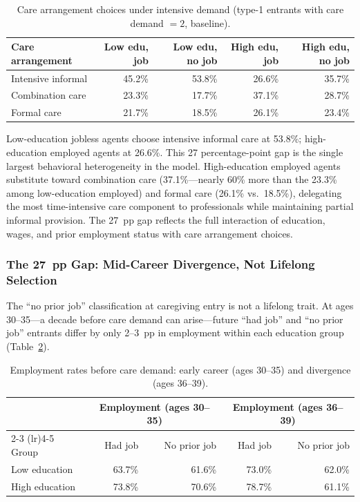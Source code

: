 \begin{table}[htbp]
  \centering
  \caption{Care arrangement choices under intensive demand (type-1 entrants with care demand $= 2$, baseline).}
  \label{tab:intensive_demand_arrangements}
  \small
  \begin{tabular}{lrrrr}
    \toprule
    Care arrangement & Low edu, job & Low edu, no job & High edu, job & High edu, no job \\
    \midrule
    Intensive informal & 45.2\% & 53.8\% & 26.6\% & 35.7\% \\
    Combination care & 23.3\% & 17.7\% & 37.1\% & 28.7\% \\
    Formal care & 21.7\% & 18.5\% & 26.1\% & 23.4\% \\
    \bottomrule
  \end{tabular}
\end{table}

Low-education jobless agents choose intensive informal care at 53.8\%; high-education employed agents at 26.6\%. This 27 percentage-point gap is the single largest behavioral heterogeneity in the model. High-education employed agents substitute toward combination care (37.1\%---nearly 60\% more than the 23.3\% among low-education employed) and formal care (26.1\% vs.\ 18.5\%), delegating the most time-intensive care component to professionals while maintaining partial informal provision. The 27~pp gap reflects the full interaction of education, wages, and prior employment status with care arrangement choices.

\subsubsection{The 27~pp Gap: Mid-Career Divergence, Not Lifelong Selection}

The ``no prior job'' classification at caregiving entry is not a lifelong trait. At ages 30--35---a decade before care demand can arise---future ``had job'' and ``no prior job'' entrants differ by only 2--3~pp in employment within each education group (Table~\ref{tab:early_employment}).

\begin{table}[htbp]
  \centering
  \caption{Employment rates before care demand: early career (ages 30--35) and divergence (ages 36--39).}
  \label{tab:early_employment}
  \small
  \begin{tabular}{lrrrr}
    \toprule
    & \multicolumn{2}{c}{Employment (ages 30--35)} & \multicolumn{2}{c}{Employment (ages 36--39)} \\
    \cmidrule(lr){2-3} \cmidrule(lr){4-5}
    Group & Had job & No prior job & Had job & No prior job \\
    \midrule
    Low education & 63.7\% & 61.6\% & 73.0\% & 62.0\% \\
    High education & 73.8\% & 70.6\% & 78.7\% & 61.1\% \\
    \bottomrule
  \end{tabular}
\end{table}

